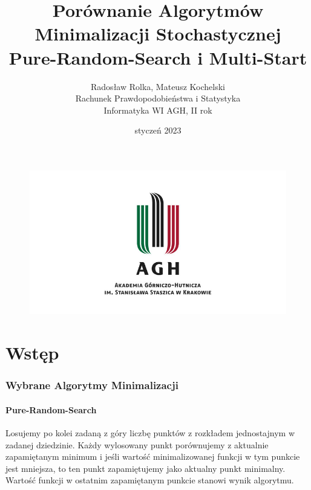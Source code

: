 \documentclass{lab}
\begin{document}
\captionsetup[lstlisting]{labelformat=myformat}

\begin{figure}
    \centering
    \includegraphics{img/agh.png}
\end{figure}
\title{\Huge \textbf{Porównanie Algorytmów Minimalizacji Stochastycznej}\\ Pure-Random-Search i Multi-Start}
\author{Radosław Rolka, Mateusz Kochelski\\Rachunek Prawdopodobieństwa i Statystyka\\Informatyka WI AGH, II rok}
\date{styczeń 2023}

\maketitle
\newpage
\tableofcontents
\thispagestyle{fancy} 
\newpage

\part{Wstęp}
\section{Wybrane Algorytmy Minimalizacji}
\subsection{Pure-Random-Search}
Losujemy po kolei zadaną z góry liczbę punktów z rozkładem jednostajnym w zadanej dziedzinie. Każdy wylosowany punkt porównujemy z aktualnie zapamiętanym minimum i jeśli wartość minimalizowanej funkcji w tym punkcie jest mniejsza, to ten punkt zapamiętujemy jako aktualny punkt minimalny. Wartość funkcji w ostatnim zapamiętanym punkcie stanowi wynik algorytmu.
\end{document}
